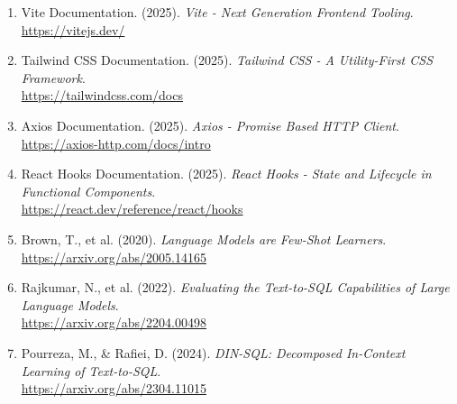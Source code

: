 \documentclass[a4paper, 12pt]{article}
\begin{document}
\begin{enumerate}
    \item Vite Documentation. (2025). \textit{Vite - Next Generation Frontend Tooling}. \\
    \url{https://vitejs.dev/}
    
    \item Tailwind CSS Documentation. (2025). \textit{Tailwind CSS - A Utility-First CSS Framework}. \\
    \url{https://tailwindcss.com/docs}
    
    \item Axios Documentation. (2025). \textit{Axios - Promise Based HTTP Client}. \\
    \url{https://axios-http.com/docs/intro}
    
    \item React Hooks Documentation. (2025). \textit{React Hooks - State and Lifecycle in Functional Components}. \\
    \url{https://react.dev/reference/react/hooks}
    
    \item Brown, T., et al. (2020). \textit{Language Models are Few-Shot Learners}. \\
    \url{https://arxiv.org/abs/2005.14165}
    
    \item Rajkumar, N., et al. (2022). \textit{Evaluating the Text-to-SQL Capabilities of Large Language Models}. \\
    \url{https://arxiv.org/abs/2204.00498}
    
    \item Pourreza, M., \& Rafiei, D. (2024). \textit{DIN-SQL: Decomposed In-Context Learning of Text-to-SQL}. \\
    \url{https://arxiv.org/abs/2304.11015}
\end{enumerate}
\end{document}
